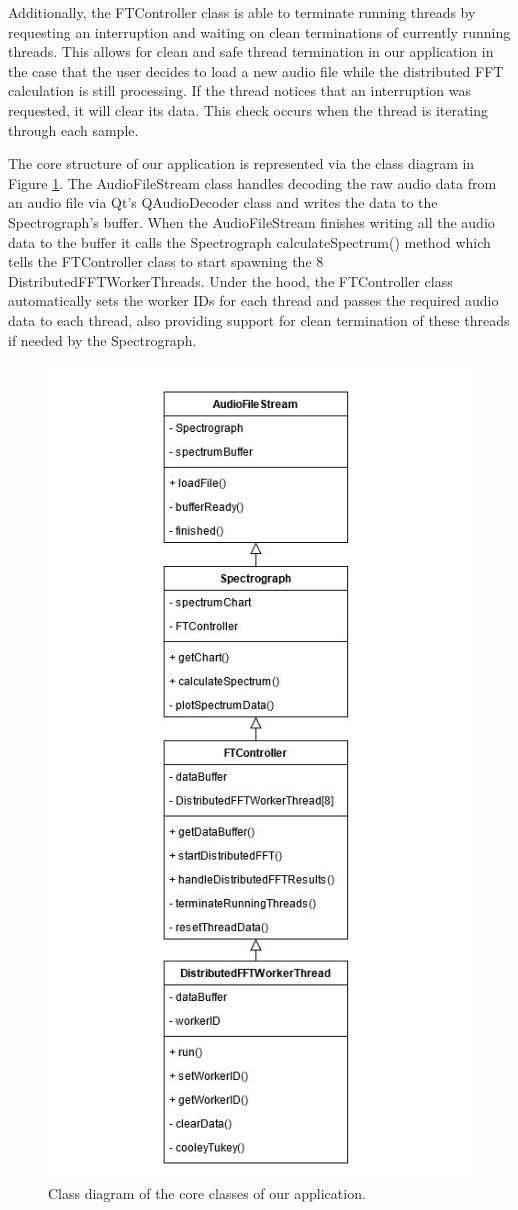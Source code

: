 \documentclass[journal]{IEEEtran}
\begin{document}
    \par{
		Additionally, the FTController class is able to terminate running threads by requesting an interruption and 
		waiting on clean terminations of currently running threads. This allows for clean and safe thread termination
		in our application in the case that the user decides to load a new audio file while the distributed FFT calculation
		is still processing. If the thread notices that an interruption was requested, it will clear 
		its data. This check occurs when the thread is iterating through each sample.
	}

	\par{
		The core structure of our application is represented via the class
		diagram in Figure \ref{fig:class-diagram}. The AudioFileStream class
		handles decoding the raw audio data from an audio file via Qt's
		QAudioDecoder class and writes the data to the Spectrograph's buffer.
		When the AudioFileStream finishes writing all the audio data to the
		buffer it calls the Spectrograph calculateSpectrum() method which
		tells the FTController class to start spawning the 8
		DistributedFFTWorkerThreads. Under the hood, the FTController class
		automatically sets the worker IDs for each thread and passes the
		required audio data to each thread, also providing support for
		clean termination of these threads if needed by the Spectrograph.
	}

	\begin{figure}
		\centering
		\includegraphics[height=0.75\textwidth]{class-diagram}
		\caption{Class diagram of the core classes of our application.}
		\label{fig:class-diagram}
	\end{figure}
\end{document}
